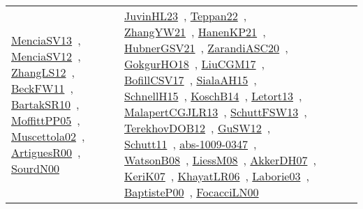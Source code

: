 {\begin{longtable}{lp{3cm}>{\raggedright\arraybackslash}p{6cm}>{\raggedright\arraybackslash}p{6cm}>{\raggedright\arraybackslash}p{8cm}}
\href{works/MenciaSV13.pdf}{MenciaSV13}~\cite{MenciaSV13}, \href{works/MenciaSV12.pdf}{MenciaSV12}~\cite{MenciaSV12}, \href{works/ZhangLS12.pdf}{ZhangLS12}~\cite{ZhangLS12}, \href{works/BeckFW11.pdf}{BeckFW11}~\cite{BeckFW11}, \href{works/BartakSR10.pdf}{BartakSR10}~\cite{BartakSR10}, \href{works/MoffittPP05.pdf}{MoffittPP05}~\cite{MoffittPP05}, \href{works/Muscettola02.pdf}{Muscettola02}~\cite{Muscettola02}, \href{works/ArtiguesR00.pdf}{ArtiguesR00}~\cite{ArtiguesR00}, \href{works/SourdN00.pdf}{SourdN00}~\cite{SourdN00} & \href{works/JuvinHL23.pdf}{JuvinHL23}~\cite{JuvinHL23}, \href{works/Teppan22.pdf}{Teppan22}~\cite{Teppan22}, \href{works/ZhangYW21.pdf}{ZhangYW21}~\cite{ZhangYW21}, \href{works/HanenKP21.pdf}{HanenKP21}~\cite{HanenKP21}, \href{works/HubnerGSV21.pdf}{HubnerGSV21}~\cite{HubnerGSV21}, \href{works/ZarandiASC20.pdf}{ZarandiASC20}~\cite{ZarandiASC20}, \href{works/GokgurHO18.pdf}{GokgurHO18}~\cite{GokgurHO18}, \href{works/LiuCGM17.pdf}{LiuCGM17}~\cite{LiuCGM17}, \href{works/BofillCSV17.pdf}{BofillCSV17}~\cite{BofillCSV17}, \href{works/SialaAH15.pdf}{SialaAH15}~\cite{SialaAH15}, \href{works/SchnellH15.pdf}{SchnellH15}~\cite{SchnellH15}, \href{works/KoschB14.pdf}{KoschB14}~\cite{KoschB14}, \href{works/Letort13.pdf}{Letort13}~\cite{Letort13}, \href{works/MalapertCGJLR13.pdf}{MalapertCGJLR13}~\cite{MalapertCGJLR13}, \href{works/SchuttFSW13.pdf}{SchuttFSW13}~\cite{SchuttFSW13}, \href{works/TerekhovDOB12.pdf}{TerekhovDOB12}~\cite{TerekhovDOB12}, \href{works/GuSW12.pdf}{GuSW12}~\cite{GuSW12}, \href{works/Schutt11.pdf}{Schutt11}~\cite{Schutt11}, \href{works/abs-1009-0347.pdf}{abs-1009-0347}~\cite{abs-1009-0347}, \href{works/WatsonB08.pdf}{WatsonB08}~\cite{WatsonB08}, \href{works/LiessM08.pdf}{LiessM08}~\cite{LiessM08}, \href{works/AkkerDH07.pdf}{AkkerDH07}~\cite{AkkerDH07}, \href{works/KeriK07.pdf}{KeriK07}~\cite{KeriK07}, \href{works/KhayatLR06.pdf}{KhayatLR06}~\cite{KhayatLR06}, \href{works/Laborie03.pdf}{Laborie03}~\cite{Laborie03}, \href{works/BaptisteP00.pdf}{BaptisteP00}~\cite{BaptisteP00}, \href{works/FocacciLN00.pdf}{FocacciLN00}~\cite{FocacciLN00}\\

\end{longtable}}
